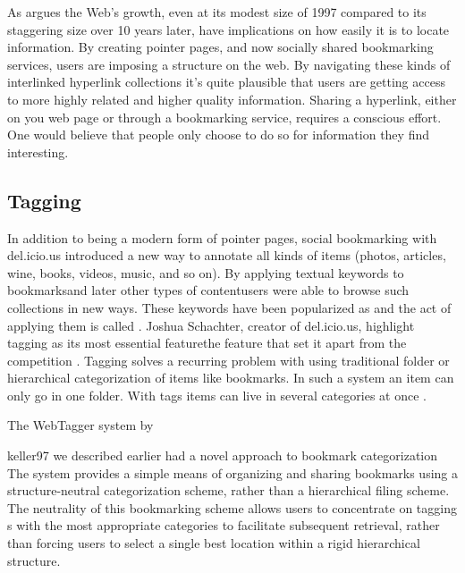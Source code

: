 As \citet[]{dieberger97} argues the Web's growth, even at its modest
size of 1997 compared to its staggering size over 10 years later, have
implications on how easily it is to locate information. By creating pointer
pages, and now socially shared bookmarking services, users are imposing a
structure on the web. By navigating these kinds of interlinked hyperlink
collections it's quite plausible that users are getting access to more highly
related and higher quality information. Sharing a hyperlink, either on you web
page or through a bookmarking service, requires a conscious effort. One would
believe that people only choose to do so for information they find
interesting.

\subsection{Tagging}

In addition to being a modern form of pointer pages, social bookmarking
with del.icio.us introduced a new way to annotate all kinds of
items (photos, articles, wine, books, videos, music, and so on).
By applying textual keywords to
bookmarks\dash{}and later other types of content\dash{}users were able to
browse such collections in new ways. These keywords have been popularized as
 and the act of applying them is called .%
Joshua Schachter, creator of del.icio.us, highlight tagging as its most
essential feature\dash{}the feature that set it apart from the competition
\cite[]{livingston07}. Tagging solves a recurring problem with
using traditional folder or hierarchical categorization of items like
bookmarks. In such a system an item can only go in one folder. With
tags items can live in several categories at once
\citep[]{weinberger07}.

The WebTagger system by
\begin{fullquote}[\p{1109}]{keller97}{%
  we described earlier had a novel approach to bookmark categorization}
    The system provides a simple means of organizing and sharing bookmarks
    using a structure-neutral categorization scheme, rather than a
    hierarchical filing scheme. The neutrality of this bookmarking scheme
    allows users to concentrate on tagging s with the most
    appropriate categories to facilitate subsequent retrieval, rather than
    forcing users to select a single best location within a rigid hierarchical
    structure.
\end{fullquote}

